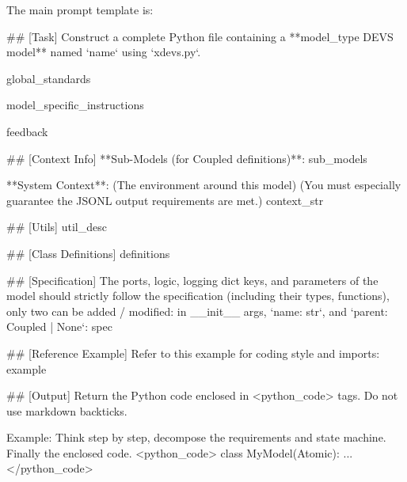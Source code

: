 The main prompt template is: 
\begin{promptbox}
## [Task]
Construct a complete Python file containing a **{model_type} DEVS model** named `{name}` using `xdevs.py`.

{global_standards}

{model_specific_instructions}

{feedback}

## [Context Info]
**Sub-Models (for Coupled definitions)**: 
{sub_models}

**System Context**:
(The environment around this model)
(You must especially guarantee the JSONL output requirements are met.)
{context_str}

## [Utils]
{util_desc}

## [Class Definitions]
{definitions}

## [Specification]
The ports, logic, logging dict keys, and parameters of the model should strictly follow the specification (including their types, functions), only two can be added / modified: in __init__ args, `name: str`, and `parent: Coupled | None`:
{spec}

## [Reference Example]
Refer to this example for coding style and imports:
{example}

## [Output]
Return the Python code enclosed in <python_code> tags. 
Do not use markdown backticks.

Example:
Think step by step, decompose the requirements and state machine.
Finally the enclosed code.
<python_code>
class MyModel(Atomic):
    ...
</python_code>
\end{promptbox}

